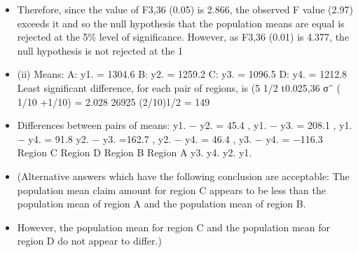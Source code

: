 \documentclass[a4paper,12pt]{article}
\begin{document}
\begin{itemize}
\item Therefore, since the value of F3,36 (0.05) is 2.866, the observed F value (2.97)
exceeds it and so the null hypothesis that the population means are equal is
rejected at the 5\% level of significance. However, as F3,36 (0.01) is 4.377, the
null hypothesis is not rejected at the 1%
\item  (ii) Means:
A: y1. = 1304.6 B: y2. = 1259.2
C: y3. = 1096.5 D: y4. = 1212.8
Least significant difference, for each pair of regions, is (5%
1/2
t0.025,36 σˆ ( 1/10 +1/10) = 2.028 26925 (2/10)1/2 = 149
\item Differences between pairs of means:
y1. − y2. = 45.4 , y1. − y3. = 208.1 , y1. − y4. = 91.8
y2. − y3. =162.7 , y2. − y4. = 46.4 , y3. − y4. = −116.3
Region C Region D Region B Region A
y3. y4. y2. y1.
\item  (Alternative answers which have the following conclusion are acceptable:
The population mean claim amount for region C appears to be less than the
population mean of region A and the population mean of region B.
\item However,
the population mean for region C and the population mean for region D do not
appear to differ.)
\end{itemize}
\end{document}
